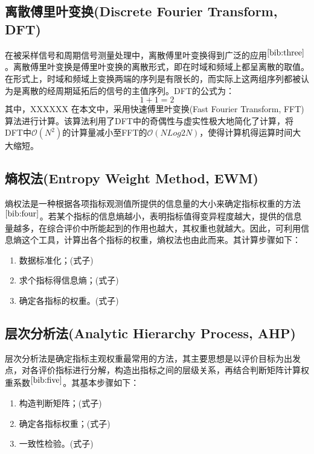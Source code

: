 \documentclass[bwprint]{cumcmthesis}
\begin{document}
        \subsection{离散傅里叶变换(Discrete Fourier Transform, DFT)}
        在被采样信号和周期信号测量处理中，离散傅里叶变换得到广泛的应用$^{\cite{bib:three}}$。离散傅里叶变换是傅里叶变换的离散形式，即在时域和频域上都呈离散的取值。在形式上，时域和频域上变换两端的序列是有限长的，而实际上这两组序列都被认为是离散的经周期延拓后的信号的主值序列。DFT的公式为：
        \begin{equation*}
            1+1=2
        \end{equation*}
        其中，XXXXXX
        在本文中，采用快速傅里叶变换(Fast Fourier Transform, FFT)算法进行计算。该算法利用了DFT中的奇偶性与虚实性极大地简化了计算，将DFT中$\mathcal{O}(N^2)$的计算量减小至FFT的$\mathcal{O}(NLog2N)$，使得计算机得运算时间大大缩短。

        \subsection{熵权法(Entropy Weight Method, EWM)}
        熵权法是一种根据各项指标观测值所提供的信息量的大小来确定指标权重的方法$^{\cite{bib:four}}$。若某个指标的信息熵越小，表明指标值得变异程度越大，提供的信息量越多，在综合评价中所能起到的作用也越大，其权重也就越大。因此，可利用信息熵这个工具，计算出各个指标的权重，熵权法也由此而来。其计算步骤如下：
        \begin{enumerate}
            \item 数据标准化；(式子)
            \item 求个指标得信息熵；(式子)
            \item 确定各指标的权重。(式子)
        \end{enumerate}
        
        \subsection{层次分析法(Analytic Hierarchy Process, AHP)}
        层次分析法是确定指标主观权重最常用的方法，其主要思想是以评价目标为出发点，对各评价指标进行分解，构造出指标之间的层级关系，再结合判断矩阵计算权重系数$^{\cite{bib:five}}$。其基本步骤如下：
        \begin{enumerate}
            \item 构造判断矩阵；(式子)
            \item 确定各指标权重；(式子)
            \item 一致性检验。(式子)
        \end{enumerate}
\end{document}
